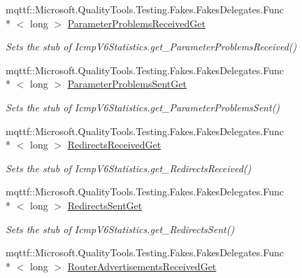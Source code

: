 \begin{DoxyCompactItemize}
mqttf\-::\-Microsoft.\-Quality\-Tools.\-Testing.\-Fakes.\-Fakes\-Delegates.\-Func\\*
$<$ long $>$ \hyperlink{class_system_1_1_net_1_1_network_information_1_1_fakes_1_1_stub_icmp_v6_statistics_a99b5d855016ca31e0b27642df58bb202}{Parameter\-Problems\-Received\-Get}
\begin{DoxyCompactList}\small\item\em Sets the stub of Icmp\-V6\-Statistics.\-get\-\_\-\-Parameter\-Problems\-Received()\end{DoxyCompactList}\item 
mqttf\-::\-Microsoft.\-Quality\-Tools.\-Testing.\-Fakes.\-Fakes\-Delegates.\-Func\\*
$<$ long $>$ \hyperlink{class_system_1_1_net_1_1_network_information_1_1_fakes_1_1_stub_icmp_v6_statistics_a7c10d5e05f28916a2621895f8a153de0}{Parameter\-Problems\-Sent\-Get}
\begin{DoxyCompactList}\small\item\em Sets the stub of Icmp\-V6\-Statistics.\-get\-\_\-\-Parameter\-Problems\-Sent()\end{DoxyCompactList}\item 
mqttf\-::\-Microsoft.\-Quality\-Tools.\-Testing.\-Fakes.\-Fakes\-Delegates.\-Func\\*
$<$ long $>$ \hyperlink{class_system_1_1_net_1_1_network_information_1_1_fakes_1_1_stub_icmp_v6_statistics_a7f1c6dfd780793033afceafcab71fa0a}{Redirects\-Received\-Get}
\begin{DoxyCompactList}\small\item\em Sets the stub of Icmp\-V6\-Statistics.\-get\-\_\-\-Redirects\-Received()\end{DoxyCompactList}\item 
mqttf\-::\-Microsoft.\-Quality\-Tools.\-Testing.\-Fakes.\-Fakes\-Delegates.\-Func\\*
$<$ long $>$ \hyperlink{class_system_1_1_net_1_1_network_information_1_1_fakes_1_1_stub_icmp_v6_statistics_a82d8bd252b46627eafde5636e1d5c8e3}{Redirects\-Sent\-Get}
\begin{DoxyCompactList}\small\item\em Sets the stub of Icmp\-V6\-Statistics.\-get\-\_\-\-Redirects\-Sent()\end{DoxyCompactList}\item 
mqttf\-::\-Microsoft.\-Quality\-Tools.\-Testing.\-Fakes.\-Fakes\-Delegates.\-Func\\*
$<$ long $>$ \hyperlink{class_system_1_1_net_1_1_network_information_1_1_fakes_1_1_stub_icmp_v6_statistics_a7dfd98f072231e388452efbad0372ffd}{Router\-Advertisements\-Received\-Get}

\end{DoxyCompactItemize}

